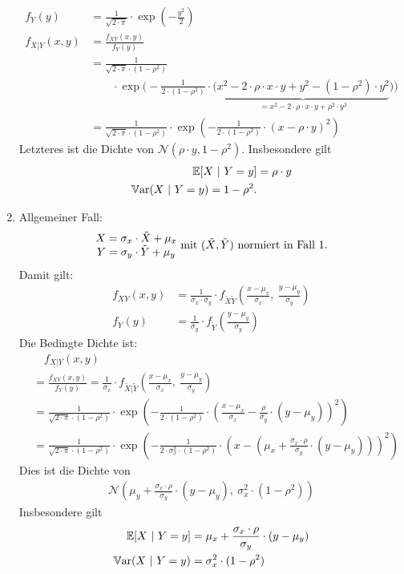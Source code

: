 \begin{beisp}
\begin{enumerate}
\begin{align*}
f_Y(y) &=\frac{1}{\sqrt{2\cdot\pi}}\cdot\exp\left(-\frac{y^2}{2}\right)\\
f_{X|Y}(x,y)&=\frac{f_{XY}(x,y)}{f_Y(y)}\\
&=\frac{1}{\sqrt{2\cdot\pi}\cdot(1-\rho^2)}\\
&\qquad\cdot\exp\Bigg(-\frac{1}{2\cdot(1-\rho^2)}\cdot\big(\underbrace{x^2-2\cdot\rho\cdot x\cdot y+y^2-(1-\rho^2)\cdot y^2}_{=x^2-2\cdot\rho\cdot x\cdot y+\rho^2\cdot y^2}\big)\Bigg)\\
&=\frac{1}{\sqrt{2\cdot\pi}\cdot(1-\rho^2)}\cdot\exp\left(-\frac{1}{2\cdot(1-\rho^2)}\cdot(x-\rho\cdot y)^2\right)
\end{align*}
Letzteres ist die Dichte von $\mathcal{N}(\rho\cdot y,1-\rho^2)$. Insbesondere gilt
\begin{align*}
\E[X~|~Y=y]&=\rho\cdot y\\
\Var(X~|~Y=y)=1-\rho^2.
\end{align*}
\item Allgemeiner Fall:
\begin{align*}
\begin{matrix}
X=\sigma_x\cdot\tilde{X}+\mu_x\\
Y=\sigma_y\cdot\tilde{Y}+\mu_y
\end{matrix}\mit(\tilde{X},\tilde{Y})\text{ normiert in Fall 1.}
\end{align*}
Damit gilt:
\begin{align*}
f_{XY}(x,y) 
&=\frac{1}{\sigma_x\cdot\sigma_y}\cdot f_{\tilde{X}\tilde{Y}}\left(\frac{x-\mu_x}{\sigma_x},~\frac{y-\mu_y}{\sigma_y}\right)\\
f_Y(y) &= \frac{1}{\sigma_y}\cdot f_{\tilde{Y}}\left(\frac{y-\mu_y}{\sigma_y}\right)
\end{align*}
Die Bedingte Dichte ist:
\begin{align*}
&\quad f_{X|Y}(x,y) \\
&=\frac{f_{XY}(x,y)}{f_Y(y)}
=\frac{1}{\sigma_x}\cdot f_{\tilde{X}|\tilde{Y}}\left(\frac{x-\mu_x}{\sigma_x},~\frac{y-\mu_y}{\sigma_y}\right)\\
&=\frac{1}{\sqrt{2\cdot\pi}\cdot(1-\rho^2)}\cdot\exp\left(-\frac{1}{2\cdot(1-\rho^2)}\cdot\left(\frac{x-\mu_x}{\sigma_x}-\frac{\rho}{\sigma_y}\cdot(y-\mu_y)\right)^2\right)\\
&=\frac{1}{\sqrt{2\cdot\pi}\cdot(1-\rho^2)}\cdot\exp\left(-\frac{1}{2\cdot\sigma_x^2\cdot(1-\rho^2)}\cdot\left(x-\left(\mu_x+\frac{\sigma_x\cdot\rho}{\sigma_y}\cdot(y-\mu_y)\right)\right)^2\right)
\end{align*}
Dies ist die Dichte von
\begin{align*}
\mathcal{N}\left(\mu_y+\frac{\sigma_x\cdot\rho}{\sigma_y}\cdot(y-\mu_y),~\sigma_x^2\cdot(1-\rho^2)\right)
\end{align*}
Insbesondere gilt
\begin{align*}
\E[X~|~Y=y]&=\mu_x+\frac{\sigma_x\cdot\rho}{\sigma_y}\cdot(y-\mu_y)\\
\Var(X~|~Y=y)&=\sigma_x^2\cdot(1-\rho^2)
\end{align*}
\end{enumerate}
\end{beisp}

